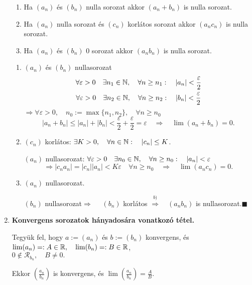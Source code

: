 \documentclass[a4paper,11.5pt]{article}
\begin{document}
\begin{enumerate}
		\begin{enumerate}
			\item Ha $(a_n)$ és $(b_n)$ nulla sorozat akkor $(a_n+b_n)$ is nulla sorozat.
			\item Ha $(a_n)$ nulla sorozat és $(c_n)$ korlátos sorozat akkor $(a_nc_n)$ is nulla sorozat.
			\item Ha $(a_n)$ és $(b_n)$ 0 sorozat akkor $(a_nb_n)$ is nulla sorozat.
		\end{enumerate}
		\biz
		\begin{enumerate}
			\item $(a_n)$ és $(b_n)$ nullasorozat
			\[\begin{gathered}
			\forall \varepsilon>0 \quad \exists n_1\in\mathbb{N}, \quad \forall n\geq n_1:\quad |a_n|<\frac{\varepsilon}{2}\\
			\forall \varepsilon>0 \quad \exists n_2\in\mathbb{N}, \quad \forall n\geq n_2:\quad |b_n|<\frac{\varepsilon}{2}
			\end{gathered}\]
			$\Rightarrow \forall\varepsilon>0,\quad  n_0:=\max\{ n_1,n_2 \}, \quad \forall n\geq n_0$
			\[ |a_n+b_n|\leq |a_n|+|b_n|< \frac{\varepsilon}{2}+\frac{\varepsilon}{2}=\varepsilon\quad  \Rightarrow\quad  \lim(a_n+b_n)=0. \]
			
			\item $(c_n)$ korlátos: \quad $\exists K>0,\quad \forall n\in \mathbb{N}:\quad |c_n|\leq K$.
			
			$(a_n)$ nullasorozat: \quad $
			\forall \varepsilon>0 \quad \exists n_0\in\mathbb{N}, \quad \forall n\geq n_0:\quad |a_n|<\varepsilon$
			\[ \Rightarrow |c_na_n|=|c_n||a_n|< K\varepsilon\quad \forall n\geq n_0 \quad \Rightarrow\quad \lim(a_nc_n)=0. \]
			
			\item $(a_n)$ nullasorozat.
			
			$(b_n)$ nullasorozat\quad  $\Rightarrow\quad $ $(b_n)$ korlátos \quad $\overset{b)}{\Longrightarrow}\quad  (a_nb_n)$ is nullasorozat.\quad $\blacksquare$
		\end{enumerate}
		
		\item \textbf{Konvergens sorozatok hányadosára vonatkozó tétel.}
		
		Tegyük fel, hogy $a:=(a_n)$ és $b:=(b_n)$ konvergens, és $\lim(a_n)=:A\in\mathbb{R},\quad  \lim(b_n)=:B\in\mathbb{R}$,\quad \\ $0\not\in\mathcal{R}_{b_n}, \quad B\not=0.$ 
		
		Ekkor $\displaystyle\left(\frac{a_n}{b_n}\right)$ is konvergens, és $\lim\displaystyle\left(\frac{a_n}{b_n}\right)=\frac{A}{B}.$
		

\end{enumerate}
\end{document}
